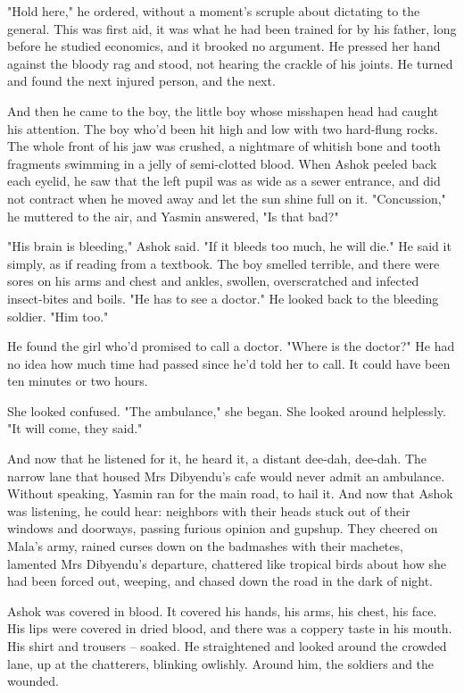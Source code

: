 "Hold here," he ordered, without a moment's scruple about dictating
to the general. This was first aid, it was what he had been trained
for by his father, long before he studied economics, and it brooked
no argument. He pressed her hand against the bloody rag and stood,
not hearing the crackle of his joints. He turned and found the next
injured person, and the next.

And then he came to the boy, the little boy whose misshapen head
had caught his attention. The boy who'd been hit high and low with
two hard-flung rocks. The whole front of his jaw was crushed, a
nightmare of whitish bone and tooth fragments swimming in a jelly
of semi-clotted blood. When Ashok peeled back each eyelid, he saw
that the left pupil was as wide as a sewer entrance, and did not
contract when he moved away and let the sun shine full on it.
"Concussion," he muttered to the air, and Yasmin answered, "Is that
bad?"

"His brain is bleeding," Ashok said. "If it bleeds too much, he
will die." He said it simply, as if reading from a textbook. The
boy smelled terrible, and there were sores on his arms and chest
and ankles, swollen, overscratched and infected insect-bites and
boils. "He has to see a doctor." He looked back to the bleeding
soldier. "Him too."

He found the girl who'd promised to call a doctor. "Where is the
doctor?" He had no idea how much time had passed since he'd told
her to call. It could have been ten minutes or two hours.

She looked confused. "The ambulance," she began. She looked around
helplessly. "It will come, they said."

And now that he listened for it, he heard it, a distant dee-dah,
dee-dah. The narrow lane that housed Mrs Dibyendu's cafe would
never admit an ambulance. Without speaking, Yasmin ran for the main
road, to hail it. And now that Ashok was listening, he could hear:
neighbors with their heads stuck out of their windows and doorways,
passing furious opinion and gupshup. They cheered on Mala's army,
rained curses down on the badmashes with their machetes, lamented
Mrs Dibyendu's departure, chattered like tropical birds about how
she had been forced out, weeping, and chased down the road in the
dark of night.

Ashok was covered in blood. It covered his hands, his arms, his
chest, his face. His lips were covered in dried blood, and there
was a coppery taste in his mouth. His shirt and trousers -- soaked.
He straightened and looked around the crowded lane, up at the
chatterers, blinking owlishly. Around him, the soldiers and the
wounded.

